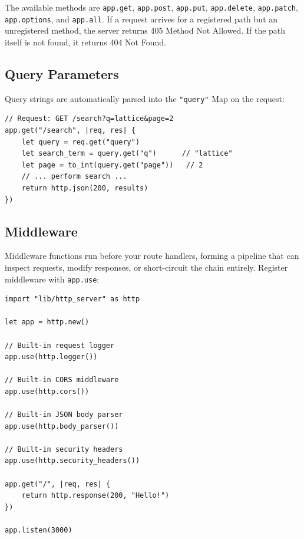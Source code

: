 The available methods are \lstinline|app.get|, \lstinline|app.post|, \lstinline|app.put|, \lstinline|app.delete|, \lstinline|app.patch|, \lstinline|app.options|, and \lstinline|app.all|.
If a request arrives for a registered path but an unregistered method, the server returns 405 Method Not Allowed.
If the path itself is not found, it returns 404 Not Found.

\subsection{Query Parameters}\label{sec:http-query-params}


Query strings are automatically parsed into the \lstinline|"query"| Map on the request:

\begin{lstlisting}[language=Lattice, caption={Reading query parameters}]
// Request: GET /search?q=lattice&page=2
app.get("/search", |req, res| {
    let query = req.get("query")
    let search_term = query.get("q")      // "lattice"
    let page = to_int(query.get("page"))   // 2
    // ... perform search ...
    return http.json(200, results)
})
\end{lstlisting}

\subsection{Middleware}\label{sec:http-middleware}


Middleware functions run before your route handlers, forming a pipeline that can inspect requests, modify responses, or short-circuit the chain entirely.
Register middleware with \lstinline|app.use|:

\begin{lstlisting}[language=Lattice, caption={Using middleware}]
import "lib/http_server" as http

let app = http.new()

// Built-in request logger
app.use(http.logger())

// Built-in CORS middleware
app.use(http.cors())

// Built-in JSON body parser
app.use(http.body_parser())

// Built-in security headers
app.use(http.security_headers())

app.get("/", |req, res| {
    return http.response(200, "Hello!")
})

app.listen(3000)
\end{lstlisting}

